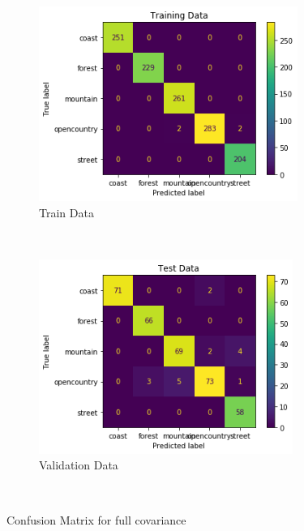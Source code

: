 
\begin{figure}[!h]
    \centering
    \begin{subfigure}[t]{0.5\textwidth}
        \centering
        \includegraphics[height=2.5in]{Dataset_2b/full covariance train confusion matrix.png} 
        \caption{Train Data}
    \end{subfigure}%
    ~ 
    \begin{subfigure}[t]{0.5\textwidth}
        \centering
        \includegraphics[height=2.5in]{Dataset_2b/full covariance test confusion matrix.png}
        \caption{Validation Data}
    \end{subfigure}%
    ~
    \caption{Confusion Matrix for full covariance}
    \label{fig:31}
\end{figure}